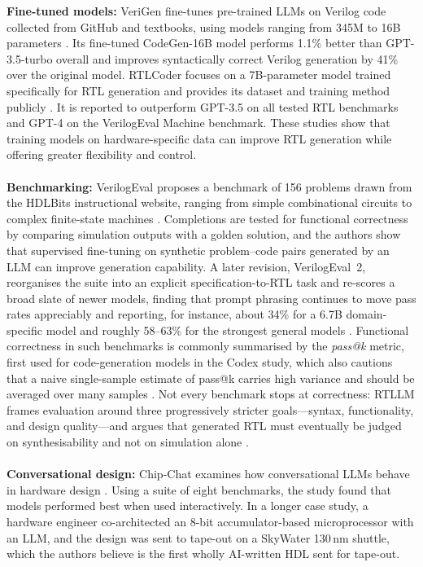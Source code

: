 \documentclass[conference]{IEEEtran}
\begin{document}
\noindent\textbf{Fine-tuned models:} VeriGen fine-tunes pre-trained LLMs on Verilog code collected from GitHub and textbooks, using models ranging from 345M to 16B parameters \cite{P11_Thakur2024}. Its fine-tuned CodeGen-16B model performs 1.1\% better than GPT-3.5-turbo overall and improves syntactically correct Verilog generation by 41\% over the original model. RTLCoder focuses on a 7B-parameter model trained specifically for RTL generation and provides its dataset and training method publicly \cite{P4_Liu2025}. It is reported to outperform GPT-3.5 on all tested RTL benchmarks and GPT-4 on the VerilogEval Machine benchmark. These studies show that training models on hardware-specific data can improve RTL generation while offering greater flexibility and control.
\\\\
\noindent\textbf{Benchmarking:} VerilogEval proposes a benchmark of 156 problems drawn from the HDLBits instructional website, ranging from simple combinational circuits to complex finite-state machines \cite{P12_Liu2023}. Completions are tested for functional correctness by comparing simulation outputs with a golden solution, and the authors show that supervised fine-tuning on synthetic problem--code pairs generated by an LLM can improve generation capability. A later revision, VerilogEval~2, reorganises the suite into an explicit specification-to-RTL task and re-scores a broad slate of newer models, finding that prompt phrasing continues to move pass rates appreciably and reporting, for instance, about 34\% for a 6.7B domain-specific model and roughly 58--63\% for the strongest general models \cite{P15_Pinckney2025}. Functional correctness in such benchmarks is commonly summarised by the \textit{pass@k} metric, first used for code-generation models in the Codex study, which also cautions that a naive single-sample estimate of pass@k carries high variance and should be averaged over many samples \cite{P17_Chen2021Codex}. Not every benchmark stops at correctness: RTLLM frames evaluation around three progressively stricter goals---syntax, functionality, and design quality---and argues that generated RTL must eventually be judged on synthesisability and not on simulation alone \cite{P16_Lu2024}.
\\\\
\noindent \textbf{Conversational design:} Chip-Chat examines how conversational LLMs behave in hardware design \cite{P13_Blocklove2023}. Using a suite of eight benchmarks, the study found that models performed best when used interactively. In a longer case study, a hardware engineer co-architected an 8-bit accumulator-based microprocessor with an LLM, and the design was sent to tape-out on a SkyWater 130\,nm shuttle, which the authors believe is the first wholly AI-written HDL sent for tape-out.
\end{document}
